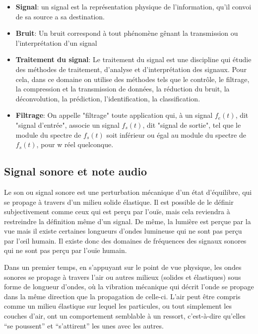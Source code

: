 \documentclass[conference,onecolumn]{IEEEtran}
\begin{document}
\begin{itemize} %
    \item[] \textbf{Signal}: un signal est la représentation physique de l'information, qu'il convoi de sa source a sa destination.

    \item[] \textbf{Bruit}: Un bruit correspond à tout phénomène gênant la transmission ou l'interprétation d'un signal

    \item[] \textbf{Traitement du signal}: Le traitement du signal est une discipline qui étudie des méthodes de traitement, d’analyse et d’interprétation des signaux. Pour cela, dans ce domaine on utilise des méthodes tels que le contrôle, le filtrage, la compression et la transmission de données, la réduction du bruit, la déconvolution, la prédiction, l'identification, la classification.  

    \item[] \textbf{Filtrage}: On appelle "filtrage" toute application qui, à un signal $f_e(t)$, dit "signal d'entrée", associe un signal $f_s(t)$, dit "signal de sortie", tel que le module du spectre de $f_s(t)$ soit inférieur ou égal au module du spectre de $f_s(t)$, pour w réel quelconque. 
\end{itemize}

\subsection{Signal sonore et note audio}
Le son ou signal sonore est une perturbation mécanique d’un état d’équilibre, qui se propage à travers d’un milieu solide élastique. Il est possible de le définir subjectivement comme ceux qui est perçu par l’ouïe, mais cela reviendra à restreindre la définition même d’un signal. De même, la lumière est perçue par la vue mais il existe certaines longueurs d’ondes lumineuse qui ne sont pas perçu par l’œil humain. Il existe donc des domaines de fréquences des signaux sonores qui ne sont pas perçu par l’ouïe humain. 

Dans un premier temps, en s’appuyant sur le point de vue physique, les ondes sonores se propage à travers l’air ou autres milieux (solides et élastiques) sous forme de longueur d’ondes, où la vibration mécanique qui décrit l’onde se propage dans la même direction que la propagation de celle-ci. L’air peut être compris comme un milieu élastique sur lequel les particules, ou tout simplement les couches d’air, ont un comportement semblable à un ressort, c’est-à-dire qu’elles “se poussent” et “s’attirent” les unes avec les autres. 
\end{document}
